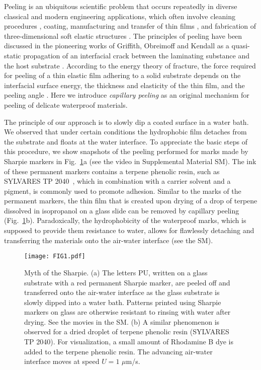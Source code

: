 \documentclass[10pt,twocolumn]{article}
\begin{document}
Peeling is an ubiquitous scientific problem that occurs repeatedly in diverse classical and modern engineering applications, which often involve cleaning procedures \cite{Boulogne2014b}, coating, manufacturing and transfer of thin films \cite{Cao:2008,Eda:2008,Lee:2011,Kim:2011a}, and fabrication of three-dimensional soft elastic structures \cite{Py:2007}.
The principles of peeling have been discussed in the pioneering works of Griffith, Obreimoff and Kendall as a quasi-static propagation of an interfacial crack between the laminating substance and the host substrate \cite{Griffith:1921,Obreimoff1930,Kendall:1971,Johnson:1971,Kendall:1975}.
According to the energy theory of fracture, the force required for peeling of a thin elastic film adhering to a solid substrate depends on the interfacial surface energy, the thickness and elasticity of the thin film, and the peeling angle \cite{Kendall:1971,Kendall:1975}.
Here we introduce \emph{capillary peeling} as an original mechanism for peeling of delicate waterproof materials.


The principle of our approach is to slowly dip a coated surface in a water bath.
We observed that under certain conditions the hydrophobic film detaches from the substrate and floats at the water interface.
To appreciate the basic steps of this procedure, we show snapshots of the peeling performed for marks made by Sharpie\textsuperscript{\textregistered} markers in Fig.~\ref{fig:sharpie}a (see the video in Supplemental Material SM).
The ink of these permanent markers contains a terpene phenolic resin, such as SYLVARES\textsuperscript{\textregistered} TP 2040~\cite{Mammen:2006}, which in combination with a carrier solvent and a pigment, is commonly used to promote adhesion.
Similar to the marks of the permanent markers, the thin film that is created upon drying of a drop of terpene dissolved in isopropanol on a glass slide can be removed by capillary peeling (Fig.~\ref{fig:sharpie}b).
Paradoxically, the hydrophobicity of the waterproof marks, which is supposed to provide them resistance to water, allows for flawlessly detaching and transferring the materials onto the air-water interface (see the SM).


 \begin{figure}[ht!]
     \texttt{[image: FIG1.pdf]}%
     \caption{Myth of the Sharpie\textsuperscript{\textregistered}.
     (a) The letters PU, written on a glass substrate with a red permanent Sharpie\textsuperscript{\textregistered} marker, are peeled off and transferred onto the air-water interface as the glass substrate is slowly dipped into a water bath. Patterns printed using Sharpie\textsuperscript{\textregistered} markers on glass are otherwise resistant to rinsing with water after drying. See the movies in the SM.
     (b) A similar phenomenon is observed for a dried droplet of terpene phenolic resin (SYLVARES\textsuperscript{\textregistered} TP 2040).
     For visualization, a small amount of Rhodamine B dye is added to the terpene phenolic resin.
     The advancing air-water interface moves at speed $U = 1$ $\mu$m/s.
     }
     \label{fig:sharpie}
 \end{figure}
\end{document}
